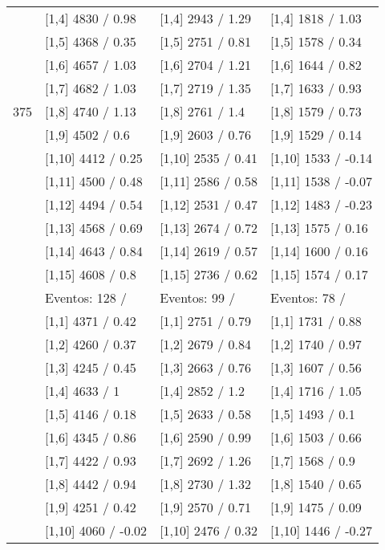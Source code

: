 \begin{table}
\begin{tabular}[t]{llll}
\addlinespace
 & {}[1,4] 4830  / 0.98 & {}[1,4] 2943  / 1.29 & {}[1,4] 1818  / 1.03\\
 & {}[1,5] 4368  / 0.35 & {}[1,5] 2751  / 0.81 & {}[1,5] 1578  / 0.34\\
 & {}[1,6] 4657  / 1.03 & {}[1,6] 2704  / 1.21 & {}[1,6] 1644  / 0.82\\
 & {}[1,7] 4682  / 1.03 & {}[1,7] 2719  / 1.35 & {}[1,7] 1633  / 0.93\\
375 & {}[1,8] 4740  / 1.13 & {}[1,8] 2761  / 1.4 & {}[1,8] 1579  / 0.73\\
\addlinespace
 & {}[1,9] 4502  / 0.6 & {}[1,9] 2603  / 0.76 & {}[1,9] 1529  / 0.14\\
 & {}[1,10] 4412  / 0.25 & {}[1,10] 2535  / 0.41 & {}[1,10] 1533  / -0.14\\
 & {}[1,11] 4500  / 0.48 & {}[1,11] 2586  / 0.58 & {}[1,11] 1538  / -0.07\\
 & {}[1,12] 4494  / 0.54 & {}[1,12] 2531  / 0.47 & {}[1,12] 1483  / -0.23\\
 & {}[1,13] 4568  / 0.69 & {}[1,13] 2674  / 0.72 & {}[1,13] 1575  / 0.16\\
\addlinespace
 & {}[1,14] 4643  / 0.84 & {}[1,14] 2619  / 0.57 & {}[1,14] 1600  / 0.16\\
 & {}[1,15] 4608  / 0.8 & {}[1,15] 2736  / 0.62 & {}[1,15] 1574  / 0.17\\
 & Eventos:  128 / & Eventos:  99 / & Eventos:  78 /\\
 & {}[1,1] 4371  / 0.42 & {}[1,1] 2751  / 0.79 & {}[1,1] 1731  / 0.88\\
 & {}[1,2] 4260  / 0.37 & {}[1,2] 2679  / 0.84 & {}[1,2] 1740  / 0.97\\
\addlinespace
 & {}[1,3] 4245  / 0.45 & {}[1,3] 2663  / 0.76 & {}[1,3] 1607  / 0.56\\
 & {}[1,4] 4633  / 1 & {}[1,4] 2852  / 1.2 & {}[1,4] 1716  / 1.05\\
 & {}[1,5] 4146  / 0.18 & {}[1,5] 2633  / 0.58 & {}[1,5] 1493  / 0.1\\
 & {}[1,6] 4345  / 0.86 & {}[1,6] 2590  / 0.99 & {}[1,6] 1503  / 0.66\\
 & {}[1,7] 4422  / 0.93 & {}[1,7] 2692  / 1.26 & {}[1,7] 1568  / 0.9\\
\addlinespace
500 & {}[1,8] 4442  / 0.94 & {}[1,8] 2730  / 1.32 & {}[1,8] 1540  / 0.65\\
 & {}[1,9] 4251  / 0.42 & {}[1,9] 2570  / 0.71 & {}[1,9] 1475  / 0.09\\
 & {}[1,10] 4060  / -0.02 & {}[1,10] 2476  / 0.32 & {}[1,10] 1446  / -0.27\\

\end{tabular}
\end{table}
